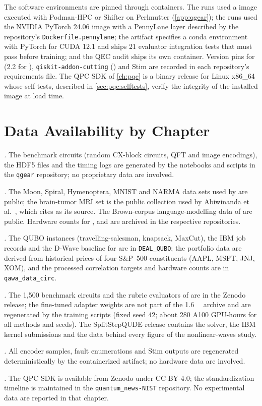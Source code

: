 The software environments are pinned through containers. The \qgear{} runs used a \cudaq{} image executed with Podman-HPC or Shifter on Perlmutter (\cref{app:qgear}); the \qpie{} runs used the NVIDIA PyTorch 24.06 image with a PennyLane layer described by the repository's \texttt{Dockerfile.pennylane}; the \rubriq{} artifact specifies a conda environment with PyTorch for CUDA 12.1 and ships 21 evaluator integration tests that must pass before training; and the QEC audit ships its own container. Version pins for \qiskit{} (2.2 for \qawa{}), \texttt{qiskit-addon-\allowbreak cutting} (\shardq{}) and Stim are recorded in each repository's requirements file. The QPC SDK of \cref{ch:pqc} is a binary release for Linux x86\_64 whose self-tests, described in \cref{sec:pqc:selftests}, verify the integrity of the installed image at load time.

\section{Data Availability by Chapter}\label{sec:apprepro:data}

\emph{.} The benchmark circuits (random CX-block circuits, QFT and \qcrank{} image encodings), the HDF5 files and the timing logs are generated by the notebooks and scripts in the \texttt{qgear} repository; no proprietary data are involved.

\emph{.} The Moon, Spiral, Hymenoptera, MNIST and NARMA data sets used by \qpie{} are public; the brain-tumor MRI set is the public collection used by Abiwinanda et al.~\cite{abiwinanda2019braintumor}, which \cite{guo2025qpie} cites as its source. The Brown-corpus language-modelling data of \vqt{} are public. Hardware counts for \vqt{}, \shardq{} and \nnqa{} are archived in the respective repositories.

\emph{.} The QUBO instances (travelling-salesman, knapsack, MaxCut), the IBM job records and the D-Wave baseline for \deal{} are in \texttt{DEAL\_QUBO}; the \qawa{} portfolio data are derived from historical prices of four S\&P~500 constituents (AAPL, MSFT, JNJ, XOM), and the processed correlation targets and hardware counts are in \texttt{qawa\_data\_circ}.

\emph{.} The 1,500 benchmark circuits and the rubric evaluators of \rubriq{} are in the Zenodo release; the fine-tuned adapter weights are not part of the \SI{1.6}{\mega\byte} archive and are regenerated by the training scripts (fixed seed 42; about 280 A100 GPU-hours for all methods and seeds). The SplitStepQUDE release contains the solver, the IBM kernel submissions and the data behind every figure of the nonlinear-waves study.

\emph{.} All encoder samples, fault enumerations and Stim outputs are regenerated deterministically by the containerized artifact; no hardware data are involved.

\emph{.} The QPC SDK is available from Zenodo under CC-BY-4.0; the standardization timeline is maintained in the \texttt{quantum\_\allowbreak news-NIST} repository. No experimental data are reported in that chapter.
